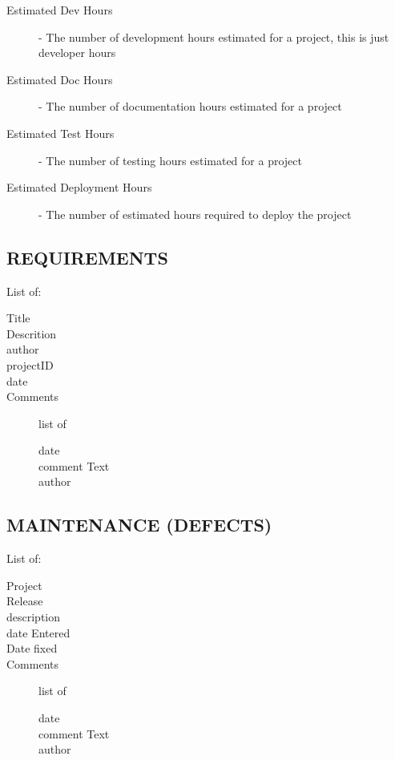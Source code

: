 \documentclass[SDSUThesis.tex]{subfiles}
\begin{document}
    
    \begin{description}
        \item[Estimated Dev Hours] - 
            The number of development hours estimated for a 
            project, this is just developer hours
        \item[Estimated Doc Hours] - 
            The number of documentation hours estimated for a project
        \item[Estimated Test Hours] - 
            The number of testing hours estimated for a project
        \item[Estimated Deployment Hours] - 
            The number of estimated hours required to 
            deploy the project
    \end{description}
    
    \subsection{REQUIREMENTS}
    List of: 
    \begin{description}
      \item[Title] 
      \item[Descrition]
      \item[author]
      \item[projectID]
      \item[date]
      \item[Comments] list of \\
      \begin{description}
        \item[date]
        \item[comment Text]
        \item[author]
      \end{description}
    \end{description}
    
    \subsection{MAINTENANCE (DEFECTS)}
    List of:
    \begin{description}
      \item[Project] 
      \item[Release]
      \item[description]
      \item[date Entered]
      \item[Date fixed]
      \item[Comments] list of \\
      \begin{description}
        \item[date]
        \item[comment Text]
        \item[author]
      \end{description}
    \end{description}
    
\end{document}
